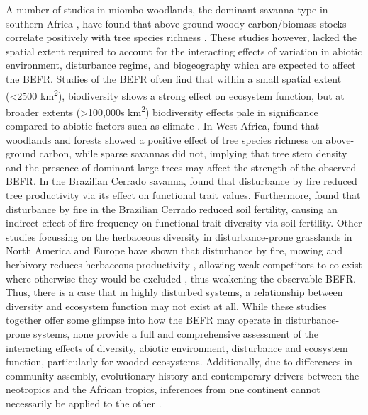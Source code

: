 \documentclass[12pt,a4paper]{article}
\begin{document}
A number of studies in miombo woodlands, the dominant savanna type in southern Africa \citep{Campbell1996}, have found that above-ground woody carbon/biomass stocks correlate positively with tree species richness \citep{McNicol2018, Shirima2015, Mutowo2012}. These studies however, lacked the spatial extent required to account for the interacting effects of variation in abiotic environment, disturbance regime, and biogeography which are expected to affect the BEFR. Studies of the BEFR often find that within a small spatial extent (<2500 km\textsuperscript{2}), biodiversity shows a strong effect on ecosystem function, but at broader extents (>100,000s km\textsuperscript{2}) biodiversity effects pale in significance compared to abiotic factors such as climate \citep{Gonzalez2020}. In West Africa, \citet{Mensah2020} found that woodlands and forests showed a positive effect of tree species richness on above-ground carbon, while sparse savannas did not, implying that tree stem density and the presence of dominant large trees may affect the strength of the observed BEFR. In the Brazilian Cerrado savanna, \citet{Loiola2015} found that disturbance by fire reduced tree productivity via its effect on functional trait values. Furthermore, \citet{Carvalho2014} found that disturbance by fire in the Brazilian Cerrado reduced soil fertility, causing an indirect effect of fire frequency on functional trait diversity via soil fertility. Other studies focussing on the herbaceous diversity in disturbance-prone grasslands in North America and Europe have shown that disturbance by fire, mowing and herbivory reduces herbaceous productivity \citep{Grace2007}, allowing weak competitors to co-exist where otherwise they would be excluded \citep{Mason2011}, thus weakening the observable BEFR. Thus, there is a case that in highly disturbed systems, a relationship between diversity and ecosystem function may not exist at all. While these studies together offer some glimpse into how the BEFR may operate in disturbance-prone systems, none provide a full and comprehensive assessment of the interacting effects of diversity, abiotic environment, disturbance and ecosystem function, particularly for wooded ecosystems. Additionally, due to differences in community assembly, evolutionary history and contemporary drivers between the neotropics and the African tropics, inferences from one continent cannot necessarily be applied to the other \citep{Dexter2015}.
\end{document}
